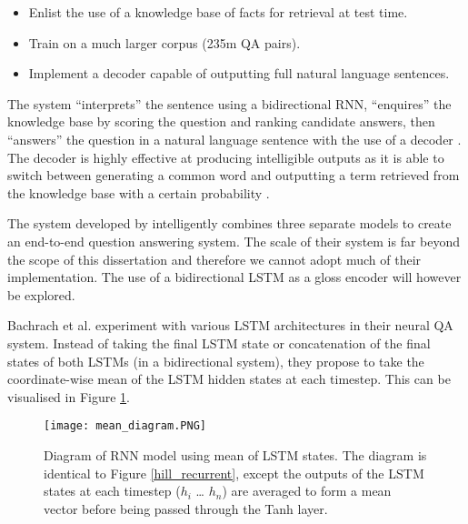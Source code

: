 \documentclass[11pt]{article}
\begin{document}
\begin{spacing}{1}
\begin{itemize}
\item Enlist the use of a knowledge base of facts for retrieval at test time.
\item Train on a much larger corpus (235m QA pairs).
\item Implement a decoder capable of outputting full natural language sentences.
\end{itemize}

The system ``interprets'' the sentence using a bidirectional RNN, ``enquires'' the knowledge base by scoring the question and ranking candidate answers, then ``answers'' the question in a natural language sentence with the use of a decoder \cite{yin2015neural}. The decoder is highly effective at producing intelligible outputs as it is able to switch between generating a common word and outputting a term retrieved from the knowledge base with a certain probability \cite{yin2015neural}.

The system developed by \cite{yin2015neural} intelligently combines three separate models to create an end-to-end question answering system. The scale of their system is far beyond the scope of this dissertation and therefore we cannot adopt much of their implementation. The use of a bidirectional LSTM as a gloss encoder will however be explored.


Bachrach et al. \citeyear{bachrach2017attention} experiment with various LSTM architectures in their neural QA system. Instead of taking the final LSTM state or concatenation of the final states of both LSTMs (in a bidirectional system), they propose to take the coordinate-wise mean of the LSTM hidden states at each timestep. This can be visualised in Figure \ref{mean_diagram}.

\begin{figure}[!htpb]
\centering
\texttt{[image: mean\_diagram.PNG]}
\caption{Diagram of RNN model using mean of LSTM states.
The diagram is identical to Figure \ref{hill_recurrent}, except the outputs of the LSTM states at each timestep ($h_i$ … $h_n$) are averaged to form a mean vector before being passed through the Tanh layer.}
\label{mean_diagram}
\end{figure}


\end{spacing}
\end{document}
